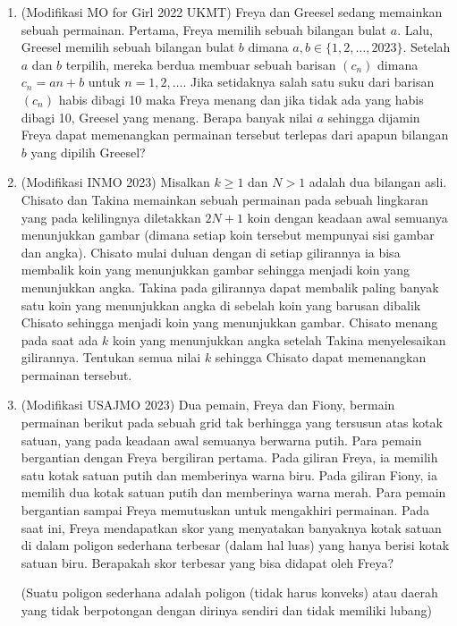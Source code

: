 \documentclass[11pt]{scrartcl}
\begin{document}
\begin{enumerate}[resume]
\item
    (Modifikasi MO for Girl 2022 UKMT) Freya dan Greesel sedang memainkan sebuah permainan. Pertama, Freya memilih sebuah bilangan bulat $a$. Lalu, Greesel memilih sebuah bilangan bulat $b$ dimana $a,b \in \{1,2,\dots,2023\}$. Setelah $a$ dan $b$ terpilih, mereka berdua membuar sebuah barisan $(c_n)$ dimana $c_n = an + b$ untuk $n = 1,2,\dots$. Jika setidaknya salah satu suku dari barisan $(c_n)$ habis dibagi 10 maka Freya menang dan jika tidak ada yang habis dibagi 10, Greesel yang menang. Berapa banyak nilai $a$ sehingga dijamin Freya dapat memenangkan permainan tersebut terlepas dari apapun bilangan $b$ yang dipilih Greesel?


\item
    (Modifikasi INMO 2023) Misalkan $k \ge 1$ dan $N > 1$ adalah dua bilangan asli. Chisato dan Takina memainkan sebuah permainan pada sebuah lingkaran yang pada kelilingnya diletakkan $2N+1$ koin dengan keadaan awal semuanya menunjukkan gambar (dimana setiap koin tersebut mempunyai sisi gambar dan angka). Chisato mulai duluan dengan di setiap gilirannya ia bisa membalik koin yang menunjukkan gambar sehingga menjadi koin yang menunjukkan angka. Takina pada gilirannya dapat membalik paling banyak satu koin yang menunjukkan angka di sebelah koin yang barusan dibalik Chisato sehingga menjadi koin yang menunjukkan gambar. Chisato menang pada saat ada $k$ koin yang menunjukkan angka setelah Takina menyelesaikan gilirannya. Tentukan semua nilai $k$ sehingga Chisato dapat memenangkan permainan tersebut.


\item
(Modifikasi USAJMO 2023) Dua pemain, Freya dan Fiony, bermain permainan berikut pada sebuah grid tak berhingga yang tersusun atas kotak satuan, yang pada keadaan awal semuanya berwarna putih. Para pemain bergantian dengan Freya bergiliran pertama. Pada giliran Freya, ia memilih satu kotak satuan putih dan memberinya warna biru. Pada giliran Fiony, ia memilih dua kotak satuan putih dan memberinya warna merah. Para pemain bergantian sampai Freya memutuskan untuk mengakhiri permainan. Pada saat ini, Freya mendapatkan skor yang menyatakan banyaknya kotak satuan di dalam poligon sederhana terbesar (dalam hal luas) yang hanya berisi kotak satuan biru. Berapakah skor terbesar yang bisa didapat oleh Freya?

(Suatu poligon sederhana adalah poligon (tidak harus konveks) atau daerah yang tidak berpotongan dengan dirinya sendiri dan tidak memiliki lubang)


\end{enumerate}
\end{document}
